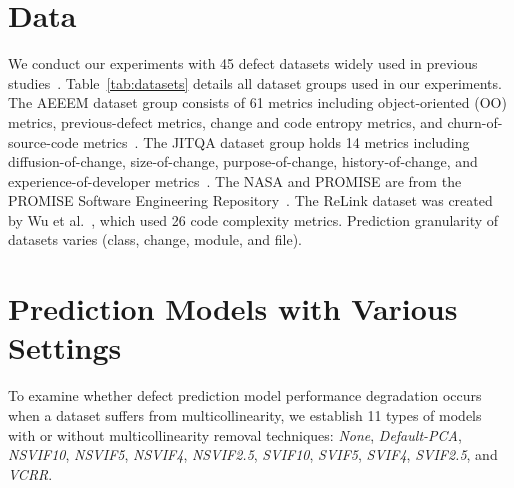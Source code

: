 \section{ Data}
We conduct our experiments with 45 defect datasets widely used in previous studies~\cite{DAmbros2012EMSEbenchmark, Wu2011FSEReLink, Kamei2013TSEjit, ghotra2017msr}.
Table~\ref{tab:datasets} details all dataset groups used in our experiments. 
The AEEEM dataset group consists of 61 metrics including object-oriented (OO) metrics, previous-defect metrics, change and code entropy metrics, and churn-of-source-code metrics~\cite{DAmbros2012EMSEbenchmark}. 
The JIT\textunderscore QA dataset group holds 14 metrics including diffusion-of-change, size-of-change, purpose-of-change, history-of-change, and experience-of-developer metrics~\cite{Kamei2013TSEjit}. 
The NASA and PROMISE are from the PROMISE Software Engineering Repository~\cite{ghotra2017msr}. 
The ReLink dataset was created by Wu et al.~\cite{Wu2011FSEReLink}, 
which used 26 code complexity metrics. %
Prediction granularity of datasets varies (class, change, module, and file).



\section{ Prediction Models with Various Settings} 
To examine whether defect prediction model performance degradation occurs when a dataset suffers from multicollinearity, 
we establish 11 types of models with or without multicollinearity removal techniques: \emph{None}, \emph{Default-PCA}, \emph{NSVIF10}, \emph{NSVIF5}, \emph{NSVIF4}, \emph{NSVIF2.5}, \emph{SVIF10}, \emph{SVIF5}, \emph{SVIF4}, \emph{SVIF2.5}, and \emph{VCRR}.

